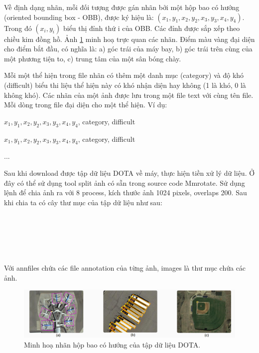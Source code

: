 \documentclass[12pt,a4paper,openany,oneside]{report}
\begin{document}
Về định dạng nhãn, mỗi đối tượng được gán nhãn bởi một hộp bao có hướng (oriented bounding box - OBB), được ký hiệu là: $(x_1, y_1, x_2, y_2, x_3, y_3, x_4, y_4)$. Trong đó $(x_i, y_i)$ biểu thị đỉnh thứ i của OBB. Các đỉnh được sắp xếp theo chiều kim đồng hồ. Ảnh \ref{minh_hoa_hop_bao_dota} minh hoạ trực quan các nhãn. Điểm màu vàng đại diện cho điểm bắt đầu, có nghĩa là: a) góc trái của máy bay, b) góc trái trên cùng của một phương tiện to, c) trung tâm của một sân bóng chày.

Mỗi một thể hiện trong file nhãn có thêm một danh mục (category) và độ khó (difficult) biểu thi liệu thể hiện này có khó nhận diện hay không (1 là khó, 0 là không khó). Các nhãn của một ảnh được lưu trong một file text với cùng tên file. Mỗi dòng trong file đại diện cho một thể hiện. Ví dụ:

$x_1, y_1, x_2, y_2, x_3, y_3, x_4, y_4$, category, difficult 

$x_1, y_1, x_2, y_2, x_3, y_3, x_4, y_4$, category, difficult 

...

Sau khi download được tập dữ liệu DOTA về máy, thực hiện tiền xử lý dữ liệu. Ở đây có thể sử dụng tool split ảnh có sẵn trong source code Mmrotate. Sử dụng lệnh để chia ảnh ra với 8 process, kích thước ảnh 1024 pixels, overlaps 200. Sau khi chia ta có cây thư mục của tập dữ liệu như sau:\\
\\
\\
\\
\\
\\



Với annfiles chứa các file annotation của từng ảnh, images là thư mục chứa các ảnh.
\begin{figure}[ht!]
	\begin{center}
		\includegraphics[width=445px]{./minh_hoa_hop_bao_dota.jpg}
		\caption{Minh hoạ nhãn hộp bao có hướng của tập dữ liệu DOTA.}
		\label{minh_hoa_hop_bao_dota}
	\end{center}
\end{figure} 
\end{document}
